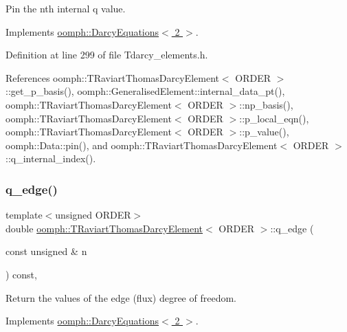 Pin the nth internal q value. 



Implements \hyperlink{classoomph_1_1DarcyEquations_a7731ceb6bd31bfd6cc6c8fa1ee369779}{oomph\+::\+Darcy\+Equations$<$ 2 $>$}.



Definition at line 299 of file Tdarcy\+\_\+elements.\+h.



References oomph\+::\+T\+Raviart\+Thomas\+Darcy\+Element$<$ O\+R\+D\+E\+R $>$\+::get\+\_\+p\+\_\+basis(), oomph\+::\+Generalised\+Element\+::internal\+\_\+data\+\_\+pt(), oomph\+::\+T\+Raviart\+Thomas\+Darcy\+Element$<$ O\+R\+D\+E\+R $>$\+::np\+\_\+basis(), oomph\+::\+T\+Raviart\+Thomas\+Darcy\+Element$<$ O\+R\+D\+E\+R $>$\+::p\+\_\+local\+\_\+eqn(), oomph\+::\+T\+Raviart\+Thomas\+Darcy\+Element$<$ O\+R\+D\+E\+R $>$\+::p\+\_\+value(), oomph\+::\+Data\+::pin(), and oomph\+::\+T\+Raviart\+Thomas\+Darcy\+Element$<$ O\+R\+D\+E\+R $>$\+::q\+\_\+internal\+\_\+index().

\mbox{\label{classoomph_1_1TRaviartThomasDarcyElement_a822218aa30be662198873b8b73a0c03c}} 
\subsubsection{\texorpdfstring{q\+\_\+edge()}{q\_edge()}}
{\footnotesize\ttfamily template$<$unsigned O\+R\+D\+ER$>$ \\
double \hyperlink{classoomph_1_1TRaviartThomasDarcyElement}{oomph\+::\+T\+Raviart\+Thomas\+Darcy\+Element}$<$ O\+R\+D\+ER $>$\+::q\+\_\+edge (\begin{DoxyParamCaption}\item[{const unsigned \&}]{n }\end{DoxyParamCaption}) const\hspace{0.3cm}{\ttfamily [inline]}, {\ttfamily [virtual]}}



Return the values of the edge (flux) degree of freedom. 



Implements \hyperlink{classoomph_1_1DarcyEquations_ab66fb06e7f90655229b0eb2b96cf3f1e}{oomph\+::\+Darcy\+Equations$<$ 2 $>$}.



